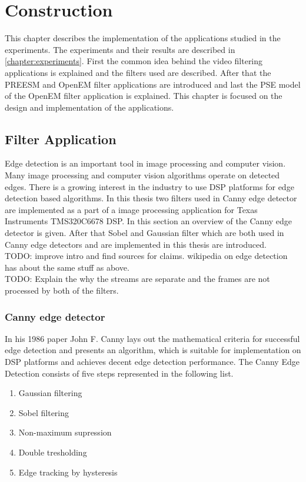 \chapter{Construction}
\label{chapter:construction}
This chapter describes the implementation of the applications studied in the
experiments. The experiments and their results are described in
\ref{chapter:experiments}. First the common idea behind the video filtering
applications is explained and the filters used are described. After that the
PREESM and OpenEM filter applications are introduced and last the PSE model of
the OpenEM filter application is explained. This chapter is focused on the
design and implementation of the applications.

\section{Filter Application}
\label{sec:filterapp}
Edge detection is an important tool in image processing and computer vision.
Many image processing and computer vision algorithms operate on detected edges.
There is a growing interest in the industry to use DSP platforms for edge
detection based algorithms. In this thesis two filters used in Canny edge
detector are implemented as a part of a image processing application for Texas
Instruments TMS320C6678 DSP. In this section an overview of the Canny edge
detector is given. After that Sobel and Gaussian filter which are both used in
Canny edge detectors and are implemented in this thesis are introduced.\\

TODO: improve intro and find sources for claims. wikipedia on edge detection has
about the same stuff as above.\\
TODO: Explain the why the streams are separate and the frames are not processed
by both of the filters.
\subsection{Canny edge detector}
In his 1986 paper John F. Canny \cite{canny1985computational} lays out the
mathematical criteria for successful edge detection and presents an algorithm,
which is suitable for implementation on DSP platforms and achieves decent edge
detection performance. The Canny Edge Detection consists of five steps
represented in the following list.

\begin{enumerate}
\item{Gaussian filtering}
\item{Sobel filtering}
\item{Non-maximum supression}
\item{Double tresholding}
\item{Edge tracking by hysteresis}
\end{enumerate}


